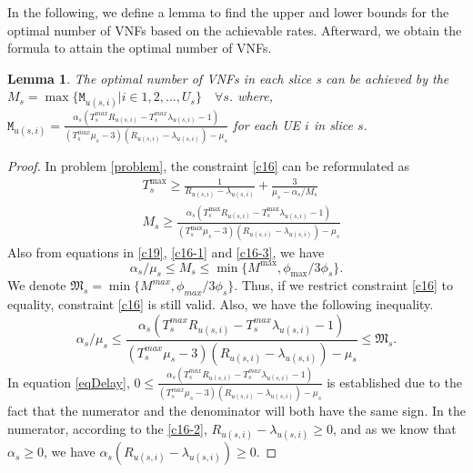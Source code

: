 \documentclass[lettersize,journal]{IEEEtran}
\newtheorem{lemma}{Lemma}
\begin{document}
In the following, we define a lemma to find the upper and lower bounds for the optimal number of VNFs based on the achievable rates. Afterward, we obtain the formula to attain the optimal number of VNFs.
\begin{lemma}\label{lemma1}
The optimal number of VNFs in each slice s can be achieved by the
$M_s = \max\{\mathtt{M}_{u(s,i)} | i \in 1,2,..., U_s\} \quad \forall s$.
where, $\mathtt{M}_{u(s,i)} = \frac{\alpha_s(T^{max}_s R_{u(s,i)}-T^{max}_s\lambda_{u(s,i)} -1)}{(T^{max}_s\mu_s-3)(R_{u(s,i)}-\lambda_{u(s,i)}) - \mu_s }$ for each UE $i$ in slice $s$.
\end{lemma}
\begin{proof}
In problem \eqref{problem}, the constraint \eqref{c16} can be reformulated as
\begin{subequations}
\begin{alignat}{4}
&T^{\max}_s \geq\frac{1}{R_{u(s,i)} - \lambda_{u(s,i)}} + \frac{3}{\mu_s - \alpha_{s}/{M_s}}  \\
&M_s \geq \frac{\alpha_s(T^{\max}_s R_{u(s,i)}-T^{\max}_s\lambda_{u(s,i)} -1)}{(T^{\max}_s\mu_s-3)(R_{u(s,i)}-\lambda_{u(s,i)}) - \mu_s }
\end{alignat}
\end{subequations}
Also from equations in \eqref{c19}, \eqref{c16-1} and \eqref{c16-3}, we have
\begin{equation}
\alpha_s/\mu_s\leq M_s \leq \min\{M^{\max}, \phi_{\max}/{3\phi_s}\}.
\end{equation}
We denote $ \mathfrak{M}_s= \min\{M^{max}, \phi_{max}/{3\phi_s}\}$.
Thus, if we restrict constraint \eqref{c16} to equality, constraint \eqref{c16} is still valid.
Also, we have the following inequality.
\begin{equation}\label{eqDelay}
\alpha_s/\mu_s\leq \frac{\alpha_s(T^{max}_s R_{u(s,i)}-T^{max}_s\lambda_{u(s,i)} -1)}{(T^{max}_s\mu_s-3)(R_{u(s,i)}-\lambda_{u(s,i)}) - \mu_s } \leq \mathfrak{M}_s.
\end{equation}
In equation \eqref{eqDelay}, $0\leq \frac{\alpha_s(T^{max}_s R_{u(s,i)}-T^{max}_s\lambda_{u(s,i)} -1)}{(T^{max}_s\mu_s-3)(R_{u(s,i)}-\lambda_{u(s,i)}) - \mu_s }$ is established due to the fact that
the numerator and the denominator will both have the same sign.
In the numerator, according to the \eqref{c16-2}, $ R_{u(s,i)}-\lambda_{u(s,i)} \geq 0$, and as we know that $\alpha_s \geq 0$, we have $ \alpha_s (R_{u(s,i)}-\lambda_{u(s,i)}) \geq 0 $.

\end{proof}
\end{document}
